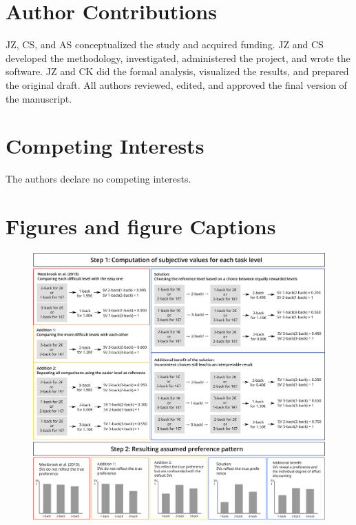 \documentclass[
  man,floatsintext]{apa6}
\begin{document}
\hypertarget{author-contributions}{%
\section{Author Contributions}\label{author-contributions}}

JZ, CS, and AS conceptualized the study and acquired funding.
JZ and CS developed the methodology, investigated, administered the project, and wrote the software.
JZ and CK did the formal analysis, visualized the results, and prepared the original draft.
All authors reviewed, edited, and approved the final version of the manuscript.

\hypertarget{competing-interests}{%
\section{Competing Interests}\label{competing-interests}}

The authors declare no competing interests.

\newpage
\setcounter{figure}{0}

\hypertarget{figures-and-figure-captions}{%
\section{Figures and figure Captions}\label{figures-and-figure-captions}}

\begin{figure}
\includegraphics[width=\textwidth]{../Inkscape Figures/Paradigm_Scheme} \caption{ }\label{fig:figure1appendix}
\end{figure}
\end{document}
